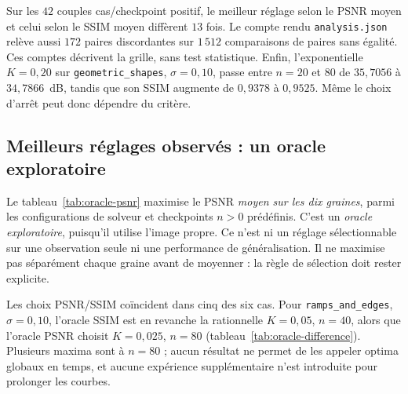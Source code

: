 Sur les $42$ couples cas/checkpoint positif, le meilleur réglage selon
le PSNR moyen et celui selon le SSIM moyen diffèrent $13$ fois.
Le compte rendu \texttt{analysis.json} relève aussi $172$ paires
discordantes sur $1\,512$ comparaisons de paires sans égalité.
Ces comptes décrivent la grille, sans test statistique. Enfin,
l'exponentielle $K=0{,}20$ sur \texttt{geometric\_shapes},
$\sigma=0{,}10$, passe entre $n=20$ et $80$ de $35{,}7056$ à
$34{,}7866$~dB, tandis que son SSIM augmente de $0{,}9378$ à $0{,}9525$.
Même le choix d'arrêt peut donc dépendre du critère.

\subsection{Meilleurs réglages observés : un oracle exploratoire}

Le tableau~\ref{tab:oracle-psnr} maximise le PSNR \emph{moyen sur les dix
graines}, parmi les configurations de solveur et checkpoints $n>0$
prédéfinis. C'est un \emph{oracle exploratoire}, puisqu'il utilise
l'image propre. Ce n'est ni un réglage sélectionnable sur une observation
seule ni une performance de généralisation. Il ne maximise pas
séparément chaque graine avant de moyenner : la règle de sélection doit
rester explicite.

\begin{table}[htbp]
 \centering
 \caption{Oracle exploratoire PSNR : maximum de la moyenne sur dix
 graines, parmi la grille figée avec $n>0$. Images et bruits indiqués
 dans chaque ligne ; dispersions échantillonnales. Tout $n=80$ est
 à la frontière temporelle étudiée, pas un optimum global.}
 \label{tab:oracle-psnr}
 
\end{table}

Les choix PSNR/SSIM coïncident dans cinq des six cas. Pour
\texttt{ramps\_and\_edges}, $\sigma=0{,}10$, l'oracle SSIM est en
revanche la rationnelle $K=0{,}05$, $n=40$, alors que l'oracle PSNR
choisit $K=0{,}025$, $n=80$ (tableau~\ref{tab:oracle-difference}).
Plusieurs maxima sont à $n=80$ ; aucun résultat ne permet de les appeler
optima globaux en temps, et aucune expérience supplémentaire n'est
introduite pour prolonger les courbes.

\begin{table}[htbp]
 \centering
 \caption{Deux oracles exploratoires distincts pour
 \texttt{ramps\_and\_edges}, $\sigma=0{,}10$ : sélection selon PSNR ou
 SSIM moyen. Dix graines ; scores et écarts-types issus du CSV,
 $\dx=\dy=1$, $\dt=0{,}20$.}
 \label{tab:oracle-difference}
 
\end{table}
